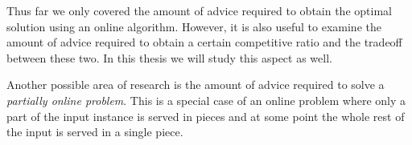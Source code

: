 Thus far we only covered the amount of advice required to obtain the
optimal solution using an online algorithm. However, it is also useful to
examine the amount of advice required to obtain a certain competitive
ratio and the tradeoff between these two. In this thesis we will study
this aspect as well.

Another possible area of research is the amount of advice required to
solve a \emph{partially online problem}. This is a special case of an
online problem where only a part of the input instance is served in pieces
and at some point the whole rest of the input is served in a single piece.
